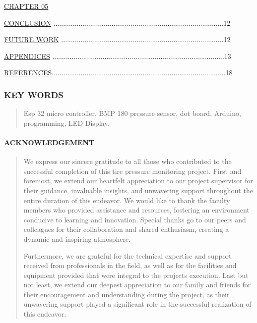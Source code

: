 \documentclass[
]{article}
\begin{document}
\protect\hyperlink{chapter-05}{CHAPTER 05}

\protect\hyperlink{conclusion}{CONCLUSION} ........................................................................................12

\protect\hyperlink{future-work}{FUTURE WORK} ....................................................................................12

\protect\hyperlink{appendices}{APPENDICES} .........................................................................................13

\protect\hyperlink{chapter-05}{REFERENCES}..........................................................................................18

\newpage

\hypertarget{key-words}{%
\subsubsection{KEY WORDS}\label{key-words}}

\begin{quote}
Esp 32 micro controller, BMP 180 pressure sensor, dot board, Arduino,
programming, LED Display.
\end{quote}

\hypertarget{acknowledgement}{%
\paragraph{ACKNOWLEDGEMENT}\label{acknowledgement}}

\begin{quote}
We express our sincere gratitude to all those who contributed to the
successful completion of this tire pressure monitoring project. First
and foremost, we extend our heartfelt appreciation to our project
supervisor for their guidance, invaluable insights, and unwavering
support throughout the entire duration of this endeavor. We would like
to thank the faculty members who provided assistance and resources,
fostering an environment conducive to learning and innovation. Special
thanks go to our peers and colleagues for their collaboration and shared
enthusiasm, creating a dynamic and inspiring atmosphere.

Furthermore, we are grateful for the technical expertise and support
received from professionals in the field, as well as for the facilities
and equipment provided that were integral to the
project\textquotesingle s execution. Last but not least, we extend our
deepest appreciation to our family and friends for their encouragement
and understanding during the project, as their unwavering support played
a significant role in the successful realization of this endeavor.
\end{quote}
\end{document}
